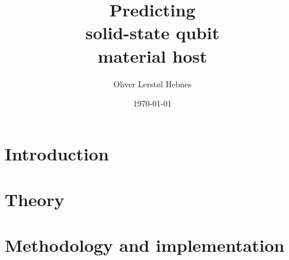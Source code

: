 \documentclass[twoside, english, notitlepage, 12pt]{uiofysmaster}
\author{Oliver Lerstøl Hebnes}
\title{Predicting\\
solid-state qubit\\
material host
}
\date{\today}
\begin{document}
\hypersetup{pageanchor=false}
\frontmatter
    \maketitle

    \begin{abstract}
    
    \end{abstract}

    \begin{acknowledgements}
    
    \end{acknowledgements}

    \setcounter{tocdepth}{2}
    \tableofcontents

\mainmatter
    \part{Introduction}
      

    \part{Theory}
        
        
        

    \part{Methodology and implementation}

        
        



\end{document}
